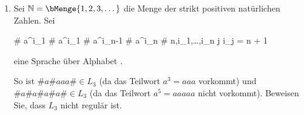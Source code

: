 \documentclass{bschlangaul-aufgabe}
\begin{document}
\begin{enumerate}

\item Sei $\mathbb{N} = \bMenge{1,2,3,\dots}$ die Menge der strikt
positiven natürlichen Zahlen. Sei

\bAusdruck[L_3]
%
{\# a^{i_1} \# a^{i_1} \# \cdots a^{i_{n-1}} \# a^{i_n} \#}
%
{n,i_1,\dots,i_n \in {}
j \in {}
i_j = n + 1}

eine Sprache über Alphabet .

So ist \zB $\#a\#aaa\# \in L_3$ (da das Teilwort $a^3 = aaa$ vorkommt)
und $\#a\#a\#a\#a\# \in L_3$ (da das Teilwort $a^5 = aaaaa$ nicht
vorkommt). Beweisen Sie, dass $L_3$ nicht regulär ist.

\end{enumerate}
\end{document}
